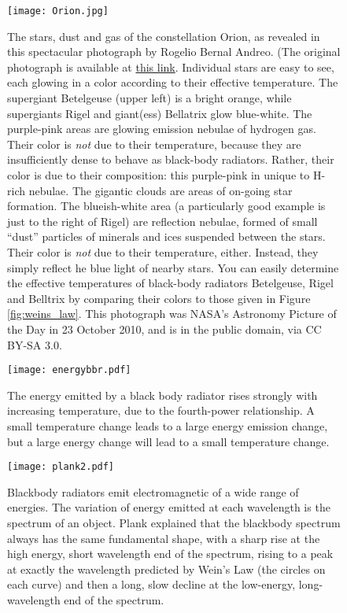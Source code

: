 \documentclass[amstex,12pt]{book}
\begin{document}
\begin{figure}[p]
\centering
\texttt{[image: Orion.jpg]}%
\caption{The stars, dust and gas of the constellation Orion, as revealed in this spectacular photograph by Rogelio Bernal Andreo. (The original photograph is available at \href{http://deepskycolors.com/astro/JPEG/RBA_Orion_HeadToToes.jpg}{this link}. Individual stars are easy to see, each glowing in a color according to their effective temperature. The supergiant Betelgeuse (upper left) is a bright orange, while supergiants Rigel and giant(ess) Bellatrix glow blue-white. The purple-pink areas are glowing emission nebulae of hydrogen gas. Their color is \emph{not} due to their temperature, because they are insufficiently dense to behave as black-body radiators. Rather, their color is due to their composition: this purple-pink in unique to H-rich nebulae. The gigantic clouds are areas of on-going star formation. The blueish-white area (a particularly good example is just to the right of Rigel) are reflection nebulae, formed of small ``dust'' particles of minerals and ices suspended between the stars. Their color is \emph{not}  due to their temperature, either. Instead, they simply reflect he blue light of nearby stars. You can easily determine the effective temperatures of black-body radiators Betelgeuse, Rigel and Belltrix by comparing their colors to those given in Figure \ref{fig:weins_law}. This photograph was NASA's Astronomy Picture of the Day in 23 October 2010, and is in the public domain, via CC BY-SA 3.0.}
\label{fig:Orion}
\end{figure}

\begin{figure}[p]
\centering
\texttt{[image: energybbr.pdf]}%
\caption{The energy emitted by a black body radiator rises strongly with increasing temperature, due to the fourth-power relationship. A small temperature change leads to a large energy emission change, but a large energy change will lead to a small temperature change. }
\label{fig:energybbr}
\end{figure}


\begin{figure}[p]
\centering
\texttt{[image: plank2.pdf]}%
\caption{Blackbody radiators emit electromagnetic of a wide range of energies. The variation of energy emitted at each wavelength is the spectrum of an object. Plank explained that the blackbody spectrum always has the same fundamental shape, with a sharp rise at the high energy, short wavelength end of the spectrum, rising to a peak at exactly the wavelength predicted by Wein's Law (the circles on each curve) and then a long, slow decline at the low-energy, long-wavelength end of the spectrum.  }
\label{fig:planks}
\end{figure}
\end{document}
